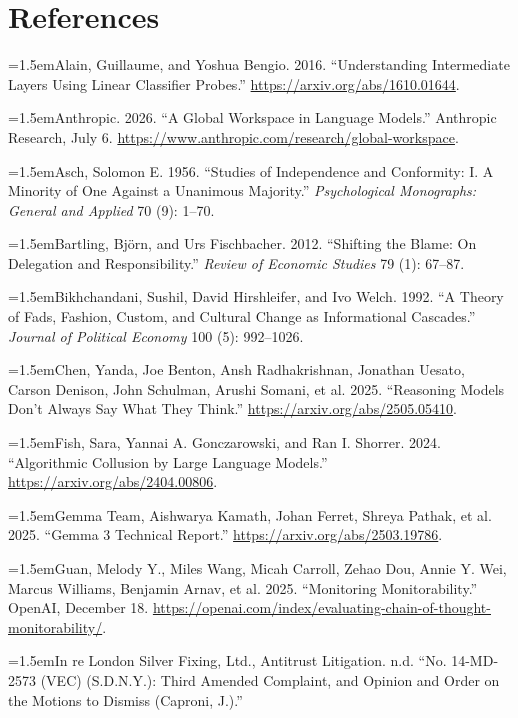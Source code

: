 \documentclass[11pt]{article}
\begin{document}
\section*{References}
\begingroup
\small
\setlength{\parindent}{0pt}
\setlength{\parskip}{0.45em}
\newcommand{\refitem}{\par\hangindent=1.5em\noindent}

\refitem Alain, Guillaume, and Yoshua Bengio. 2016. ``Understanding Intermediate Layers Using Linear Classifier Probes.'' \url{https://arxiv.org/abs/1610.01644}.

\refitem Anthropic. 2026. ``A Global Workspace in Language Models.'' Anthropic Research, July 6. \url{https://www.anthropic.com/research/global-workspace}.

\refitem Asch, Solomon E. 1956. ``Studies of Independence and Conformity: I. A Minority of One Against a Unanimous Majority.'' \textit{Psychological Monographs: General and Applied} 70 (9): 1--70.

\refitem Bartling, Bj\"{o}rn, and Urs Fischbacher. 2012. ``Shifting the Blame: On Delegation and Responsibility.'' \textit{Review of Economic Studies} 79 (1): 67--87.


\refitem Bikhchandani, Sushil, David Hirshleifer, and Ivo Welch. 1992. ``A Theory of Fads, Fashion, Custom, and Cultural Change as Informational Cascades.'' \textit{Journal of Political Economy} 100 (5): 992--1026.

\refitem Chen, Yanda, Joe Benton, Ansh Radhakrishnan, Jonathan Uesato, Carson Denison, John Schulman, Arushi Somani, et al. 2025. ``Reasoning Models Don't Always Say What They Think.'' \url{https://arxiv.org/abs/2505.05410}.

\refitem Fish, Sara, Yannai A. Gonczarowski, and Ran I. Shorrer. 2024. ``Algorithmic Collusion by Large Language Models.'' \url{https://arxiv.org/abs/2404.00806}.

\refitem Gemma Team, Aishwarya Kamath, Johan Ferret, Shreya Pathak, et al. 2025. ``Gemma 3 Technical Report.'' \url{https://arxiv.org/abs/2503.19786}.

\refitem Guan, Melody Y., Miles Wang, Micah Carroll, Zehao Dou, Annie Y. Wei, Marcus Williams, Benjamin Arnav, et al. 2025. ``Monitoring Monitorability.'' OpenAI, December 18. \url{https://openai.com/index/evaluating-chain-of-thought-monitorability/}.

\refitem In re London Silver Fixing, Ltd., Antitrust Litigation. n.d. ``No. 14-MD-2573 (VEC) (S.D.N.Y.): Third Amended Complaint, and Opinion and Order on the Motions to Dismiss (Caproni, J.).''
\end{document}

